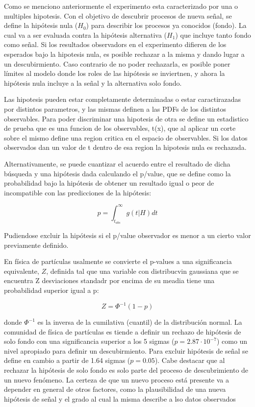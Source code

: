 Como se menciono anteriormente el experimento esta caracterizado por una o multiples hipotesis. Con el objetivo de descubrir procesos de nueva señal, se define la hipótesis nula ($H_0$) para describir los procesos ya conocidos (fondo). La cual va a ser evaluada contra la hipótesis alternativa ($H_1$) que incluye tanto fondo como señal. Si los resultados observadors en el experimento difieren de los esperados bajo la hipotesis nula, es posible rechazar a la misma y dando lugar a un descubirmiento. Caso contrario de no poder rechazarla, es posible poner límites al modelo donde los roles de las hipótesis se inviertnen, y ahora la hipótesis nula incluye a la señal y la alternativa solo fondo.

Las hipotesis pueden estar completamente determinadas o estar caractirazadas por distintos parametros, y las mismas definen a las PDFs de los distintos observables. Para poder discriminar una hipotesis de otra se define un estadistico de prueba que es una funcion de los observables, t(x), que al aplicar un corte sobre el mismo define una region critica en el espacio de observables. Si los datos observados dan un valor de t dentro de esa region la hipotesis nula es rechazada.

Alternativamente, se puede cuantizar el acuerdo entre el resultado de dicha búsqueda y una hipótesis dada calculando el p/value, que se define como la probabilidad bajo la hipótesis de obtener un resultado igual o peor de incompatible con las predicciones de la hipótesis:

\begin{equation}
	p = \int_{t_{obs}}^{\infty} g(t|H)dt
\end{equation}

Pudiendose excluir la hipótesis si el p/value observador es menor a un cierto valor previamente definido.

En física de partículas usalmente se convierte el p-values a una significancia equivalente, $Z$, definida tal que una variable con distribucvin gaussiana que se encuentra Z desviaciones standadr por encima de su meadia tiene una probabilidad superior igual a p:

\begin{equation}
	Z=\Phi^{-1}(1-p)
\end{equation}

donde $\Phi^{-1}$ es la inversa de la cumilativa (cuantil) de la distribución normal. La comunidad de física de partículas es tiende a definir un rechazo de hipótesis de solo fondo con una significancia superior a los 5 sigmas ($p=2.87 \cdot 10^{-7}$) como un nivel apropiado para definir un descubirmiento. Para excluir hipótesis de señal se define en cambio a partir de 1.64 sigmas ($p=0.05$). Cabe destacar que al rechazar la hipótesis de solo fondo es solo parte del proceso de descubrimiento de un nuevo fenómeno. La certeza de que un nuevo proceso está presente va a depender en general de otros factores, como la plausibilidad de una nueva hipótesis de señal y el grado al cual la misma describe a lso datos observados


